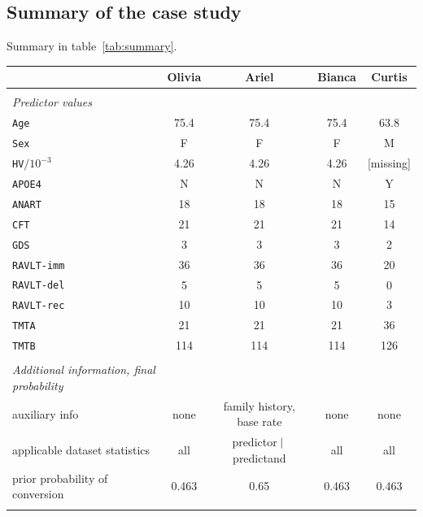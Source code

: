 \documentclass[utf8]{FrontiersinHarvard} %
\renewcommand*{\|}[1][]{\nonscript\:#1\vert\nonscript\:\mathopen{}}
\newcommand*{\age}{\texttt{Age}}
\newcommand*{\sex}{\texttt{Sex}}
\newcommand*{\apoe}{\texttt{APOE4}}
\newcommand*{\hv}{\texttt{HV}}
\newcommand*{\anart}{\texttt{ANART}}
\newcommand*{\cft}{\texttt{CFT}}
\newcommand*{\gds}{\texttt{GDS}}
\newcommand*{\ravltimm}{\texttt{RAVLT-imm}}
\newcommand*{\ravltdel}{\texttt{RAVLT-del}}
\newcommand*{\ravltrec}{\texttt{RAVLT-rec}}
\newcommand*{\tmta}{\texttt{TMTA}}
\newcommand*{\tmtb}{\texttt{TMTB}}
\begin{document}
\newpage%
\subsection{Summary of the case study}
\label{sec:summary}


Summary in table~\ref{tab:summary}.

\begin{table}[!t]
  \centering
  \begin{tabular}{lcccc}
    &{\small Olivia} &{\small Ariel} &{\small Bianca} &{\small Curtis}
    \\[\jot]
    \hline\\[-1.5\jot]
    \emph{\small Predictor values}&&&& \\[\jot]
    \age&75.4&75.4&75.4&\textcolor{redpurple}{63.8} \\
    \sex&F&F&F&\textcolor{redpurple}{M} \\
    \hv${}/10^{-3}$&4.26&4.26&4.26&\textcolor{redpurple}{[missing]} \\
    \apoe&N&N&N&\textcolor{redpurple}{Y} \\
    \anart&18&18&18&\textcolor{redpurple}{15} \\
    \cft&21&21&21&\textcolor{redpurple}{14} \\
    \gds&3&3&3&\textcolor{redpurple}{2} \\
    \ravltimm&36&36&36&\textcolor{redpurple}{20} \\
    \ravltdel&5&5&5&\textcolor{redpurple}{0} \\
    \ravltrec&10&10&10&\textcolor{redpurple}{3} \\
    \tmta&21&21&21&\textcolor{redpurple}{36} \\
    \tmtb&114&114&114&\textcolor{redpurple}{126}
    \\[2\jot] \hline\\
    \emph{\small Additional information, final probability}&&&& \\[\jot]
    {\small auxiliary info}&
    {\small none}&
    {\small\color{redpurple} family history, base rate}&
    {\small none}&
    {\small none}\\
    {\small applicable dataset statistics}&
    {\small all}&
    {\small\color{redpurple} predictor$\|$predictand}&
    {\small all}&
    {\small all}\\
    {\small prior probability of conversion}&
    0.463&\textcolor{redpurple}{0.65}&0.463&0.463
    \\[2\jot] \hline\\

\end{tabular}
\end{table}
\end{document}
